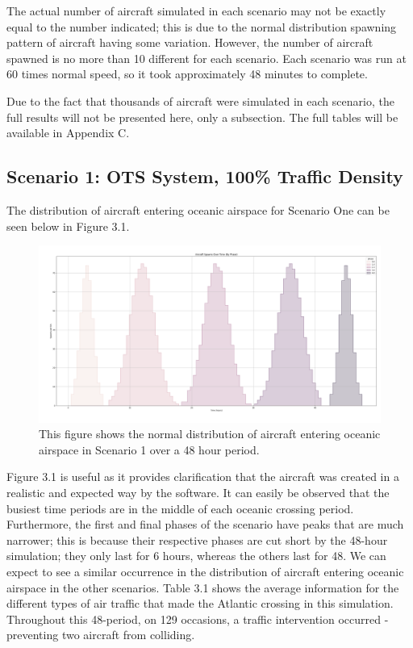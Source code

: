 \documentclass[stu, a4paper, 12pt, floatsintext]{apa7}
\numberwithin{figure}{section}
\numberwithin{table}{section}
\numberwithin{equation}{section}
\begin{document}
The actual number of aircraft simulated in each scenario may not be exactly equal to the number indicated; this is due to the normal distribution spawning pattern of aircraft having some variation. However, the number of aircraft spawned is no more than 10 different for each scenario. Each scenario was run at 60 times normal speed, so it took approximately 48 minutes to complete. 

Due to the fact that thousands of aircraft were simulated in each scenario, the full results will not be presented here, only a subsection. The full tables will be available in Appendix C.  
\subsection{Scenario 1: OTS System, 100\% Traffic Density}
The distribution of aircraft entering oceanic airspace for Scenario One can be seen below in Figure 3.1.
\begin{figure}[H]
    \caption{This figure shows the normal distribution of aircraft entering oceanic airspace in Scenario 1 over a 48 hour period.}
    \label{fig:3.1}
    \centering
    \includegraphics[width=1.1\textwidth]{pictures/Figure 3.1.png}    
\end{figure}
Figure 3.1 is useful as it provides clarification that the aircraft was created in a realistic and expected way by the software. It can easily be observed that the busiest time periods are in the middle of each oceanic crossing period. Furthermore, the first and final phases of the scenario have peaks that are much narrower; this is because their respective phases are cut short by the 48-hour simulation; they only last for 6 hours, whereas the others last for 48. We can expect to see a similar occurrence in the distribution of aircraft entering oceanic airspace in the other scenarios.
Table 3.1 shows the average information for the different types of air traffic that made the Atlantic crossing in this simulation. Throughout this 48-period, on 129 occasions, a traffic intervention occurred - preventing two aircraft from colliding. 
\end{document}
